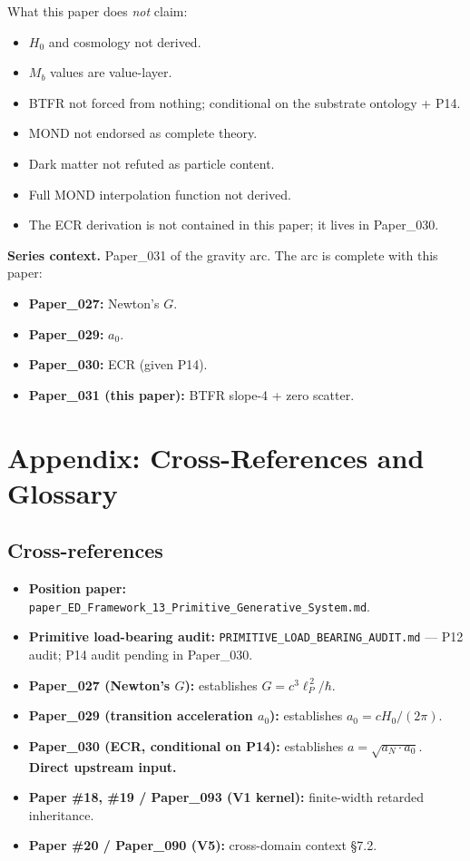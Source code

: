 \documentclass[11pt,a4paper]{article}
\begin{document}
What this paper does \emph{not} claim:

\begin{itemize}[noitemsep]
\item $H_0$ and cosmology not derived.
\item $M_b$ values are value-layer.
\item BTFR not forced from nothing; conditional on the substrate ontology + P14.
\item MOND not endorsed as complete theory.
\item Dark matter not refuted as particle content.
\item Full MOND interpolation function not derived.
\item The ECR derivation is not contained in this paper; it lives in Paper\_030.
\end{itemize}

\textbf{Series context.} Paper\_031 of the gravity arc. The arc is complete with this paper:

\begin{itemize}[noitemsep]
\item \textbf{Paper\_027:} Newton's $G$.
\item \textbf{Paper\_029:} $a_0$.
\item \textbf{Paper\_030:} ECR (given P14).
\item \textbf{Paper\_031 (this paper):} BTFR slope-4 + zero scatter.
\end{itemize}

\section*{Appendix: Cross-References and Glossary}

\subsection*{Cross-references}

\begin{itemize}[noitemsep]
\item \textbf{Position paper:} \texttt{paper\_ED\_Framework\_13\_Primitive\_Generative\_System.md}.
\item \textbf{Primitive load-bearing audit:} \texttt{PRIMITIVE\_LOAD\_BEARING\_AUDIT.md} --- P12 audit; P14 audit pending in Paper\_030.
\item \textbf{Paper\_027 (Newton's $G$):} establishes $G = c^3\ell_P^{\,2}/\hbar$.
\item \textbf{Paper\_029 (transition acceleration $a_0$):} establishes $a_0 = cH_0/(2\pi)$.
\item \textbf{Paper\_030 (ECR, conditional on P14):} establishes $a = \sqrt{a_N \cdot a_0}$. \textbf{Direct upstream input.}
\item \textbf{Paper \#18, \#19 / Paper\_093 (V1 kernel):} finite-width retarded inheritance.
\item \textbf{Paper \#20 / Paper\_090 (V5):} cross-domain context \S7.2.
\end{itemize}
\end{document}

